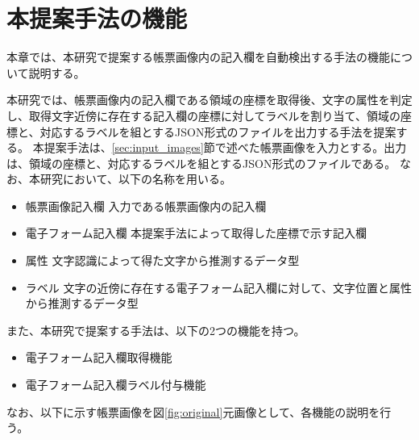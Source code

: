 \chapter{本提案手法の機能}\label{cha:Function}
本章では、本研究で提案する帳票画像内の記入欄を自動検出する手法の機能について説明する。

本研究では、帳票画像内の記入欄である領域の座標を取得後、文字の属性を判定し、取得文字近傍に存在する記入欄の座標に対してラベルを割り当て、領域の座標と、対応するラベルを組とするJSON形式のファイルを出力する手法を提案する。
本提案手法は、\ref{sec:input_images}節で述べた帳票画像を入力とする。出力は、領域の座標と、対応するラベルを組とするJSON形式のファイルである。
なお、本研究において、以下の名称を用いる。

\begin{itemize}
	\item 帳票画像記入欄
  		入力である帳票画像内の記入欄
	\item 電子フォーム記入欄
		本提案手法によって取得した座標で示す記入欄
	\item 属性
		文字認識によって得た文字から推測するデータ型
	\item ラベル
		文字の近傍に存在する電子フォーム記入欄に対して、文字位置と属性から推測するデータ型
\end{itemize}

また、本研究で提案する手法は、以下の2つの機能を持つ。

\begin{itemize}
  \item 電子フォーム記入欄取得機能
  \item 電子フォーム記入欄ラベル付与機能
\end{itemize}

なお、以下に示す帳票画像を図\ref{fig:original}元画像として、各機能の説明を行う。

